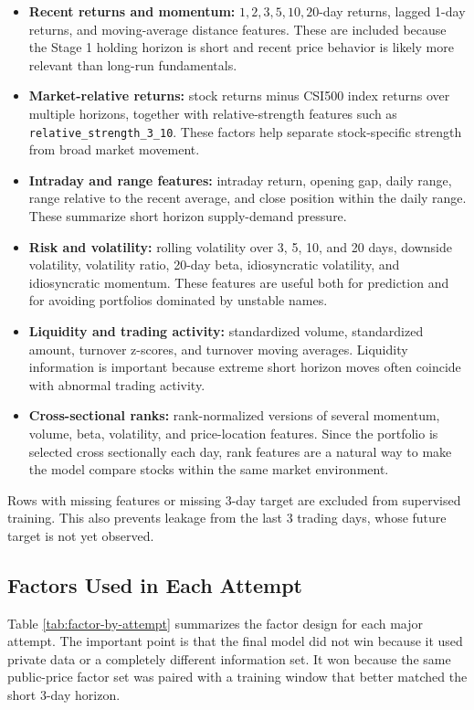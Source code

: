 \documentclass[11pt]{article}
\begin{document}
\begin{itemize}
    \item \textbf{Recent returns and momentum:}
    \(1,2,3,5,10,20\)-day returns, lagged 1-day returns, and moving-average
    distance features. These are included because the Stage 1 holding horizon
    is short and recent price behavior is likely more relevant than long-run
    fundamentals.
    \item \textbf{Market-relative returns:}
    stock returns minus CSI500 index returns over multiple horizons, together
    with relative-strength features such as
    \texttt{relative\_strength\_3\_10}. These factors help separate
    stock-specific strength from broad market movement.
    \item \textbf{Intraday and range features:}
    intraday return, opening gap, daily range, range relative to the recent
    average, and close position within the daily range. These summarize short
    horizon supply-demand pressure.
    \item \textbf{Risk and volatility:}
    rolling volatility over 3, 5, 10, and 20 days, downside volatility,
    volatility ratio, 20-day beta, idiosyncratic volatility, and idiosyncratic
    momentum. These features are useful both for prediction and for avoiding
    portfolios dominated by unstable names.
    \item \textbf{Liquidity and trading activity:}
    standardized volume, standardized amount, turnover z-scores, and turnover
    moving averages. Liquidity information is important because extreme short
    horizon moves often coincide with abnormal trading activity.
    \item \textbf{Cross-sectional ranks:}
    rank-normalized versions of several momentum, volume, beta, volatility,
    and price-location features. Since the portfolio is selected cross
    sectionally each day, rank features are a natural way to make the model
    compare stocks within the same market environment.
\end{itemize}

Rows with missing features or missing 3-day target are excluded from supervised
training. This also prevents leakage from the last 3 trading days, whose
future target is not yet observed.

\subsection{Factors Used in Each Attempt}

Table \ref{tab:factor-by-attempt} summarizes the factor design for each major
attempt. The important point is that the final model did not win because it
used private data or a completely different information set. It won because the
same public-price factor set was paired with a training window that better
matched the short 3-day horizon.
\end{document}
